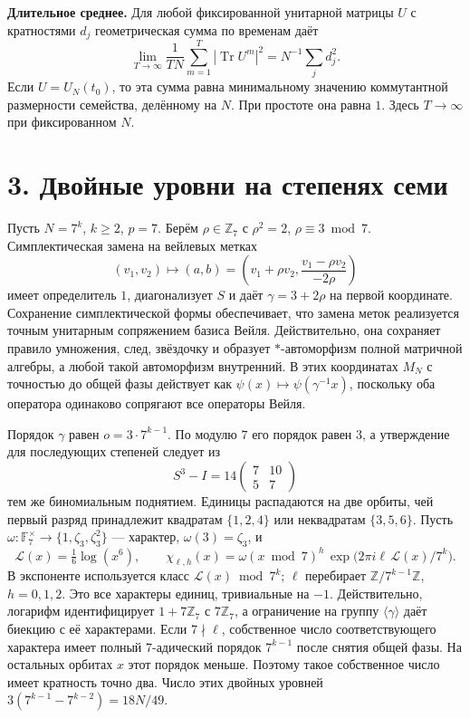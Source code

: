 \documentclass[11pt,a4paper]{article}
\newcommand{\Tr}{\operatorname{Tr}}
\newcommand{\Z}{\mathbb Z}
\newcommand{\sect}[1]{\section*{\sffamily\color{ink}#1}}
\newcommand{\subt}[1]{\par\medskip\noindent\textbf{#1.}\quad}
\newcommand{\zp}{\mathbb Z_7}
\begin{document}
\subt{Длительное среднее}
Для любой фиксированной унитарной матрицы \(U\) с кратностями \(d_j\) геометрическая сумма по временам даёт
\begin{equation}
  \lim_{T\to\infty}\frac1{TN}\sum_{m=1}^T|\Tr U^m|^2
          =N^{-1}\sum_j d_j^2.                                  \tag{1}
\end{equation}
Если \(U=U_N(t_0)\), то эта сумма равна минимальному значению коммутантной размерности семейства, делённому на \(N\). При простоте она равна \(1\). Здесь \(T\to\infty\) при фиксированном \(N\).
\newpage
\sect{3. Двойные уровни на степенях семи}
Пусть \(N=7^k\), \(k\ge2\), \(p=7\). Берём \(\rho\in\zp\) с \(\rho^2=2\), \(\rho\equiv3\bmod7\). Симплектическая замена на вейлевых метках
\[
     (v_1,v_2)\longmapsto (a,b)=
     \left(v_1+\rho v_2,\frac{v_1-\rho v_2}{-2\rho}\right)
\]
имеет определитель \(1\), диагонализует \(S\) и даёт \(\gamma=3+2\rho\) на первой координате. Сохранение симплектической формы обеспечивает, что замена меток реализуется точным унитарным сопряжением базиса Вейля. Действительно, она сохраняет правило умножения, след, звёздочку и образует \(*\)-автоморфизм полной матричной алгебры, а любой такой автоморфизм внутренний. В этих координатах \(M_N\) с точностью до общей фазы действует как \(\psi(x)\mapsto\psi(\gamma^{-1}x)\), поскольку оба оператора одинаково сопрягают все операторы Вейля.

Порядок \(\gamma\) равен \(o=3\cdot7^{k-1}\). По модулю \(7\) его порядок равен 3, а утверждение для последующих степеней следует из
\[
                    S^3-I=14\begin{pmatrix}7&10\\5&7\end{pmatrix}
\]
тем же биномиальным поднятием. Единицы распадаются на две орбиты, чей первый разряд принадлежит квадратам \(\{1,2,4\}\) или неквадратам \(\{3,5,6\}\). Пусть \(\omega:\mathbb F_7^\times\to\{1,\zeta_3,\zeta_3^2\}\) --- характер, \(\omega(3)=\zeta_3\), и
\[
 \mathcal L(x)=\tfrac16\log(x^6),\qquad
 \chi_{\ell,h}(x)=\omega(x\bmod 7)^h\,\exp\big(2\pi i\ell\,\mathcal L(x)/7^k\big).
\]
В экспоненте используется класс \(\mathcal L(x)\bmod7^k\); \(\ell\) перебирает \(\Z/7^{k-1}\Z\), \(h=0,1,2\). Это все характеры единиц, тривиальные на \(-1\). Действительно, логарифм идентифицирует \(1+7\zp\) с \(7\zp\), а ограничение на группу \(\langle\gamma\rangle\) даёт биекцию с её характерами. Если \(7\nmid \ell\), собственное число соответствующего характера имеет полный \(7\)-адический порядок \(7^{k-1}\) после снятия общей фазы. На остальных орбитах \(x\) этот порядок меньше. Поэтому такое собственное число имеет кратность точно два. Число этих двойных уровней \(3(7^{k-1}-7^{k-2})=18N/49\).
\end{document}
